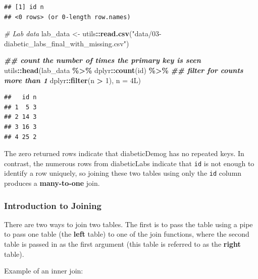 \documentclass[
]{book}
\newenvironment{Shaded}{\begin{snugshade}}{\end{snugshade}}
\newcommand{\AttributeTok}[1]{\textcolor[rgb]{0.13,0.29,0.53}{#1}}
\newcommand{\CommentTok}[1]{\textcolor[rgb]{0.56,0.35,0.01}{\textit{#1}}}
\newcommand{\DataTypeTok}[1]{\textcolor[rgb]{0.13,0.29,0.53}{#1}}
\newcommand{\DecValTok}[1]{\textcolor[rgb]{0.00,0.00,0.81}{#1}}
\newcommand{\DocumentationTok}[1]{\textcolor[rgb]{0.56,0.35,0.01}{\textbf{\textit{#1}}}}
\newcommand{\FunctionTok}[1]{\textcolor[rgb]{0.13,0.29,0.53}{\textbf{#1}}}
\newcommand{\NormalTok}[1]{#1}
\newcommand{\OtherTok}[1]{\textcolor[rgb]{0.56,0.35,0.01}{#1}}
\newcommand{\SpecialCharTok}[1]{\textcolor[rgb]{0.81,0.36,0.00}{\textbf{#1}}}
\newcommand{\StringTok}[1]{\textcolor[rgb]{0.31,0.60,0.02}{#1}}
\begin{document}
\begin{verbatim}
## [1] id n 
## <0 rows> (or 0-length row.names)
\end{verbatim}

\begin{Shaded}
\begin{Highlighting}[]
\CommentTok{\# Lab data}
\NormalTok{lab\_data }\OtherTok{\textless{}{-}}\NormalTok{ utils}\SpecialCharTok{::}\FunctionTok{read.csv}\NormalTok{(}\StringTok{"data/03{-}diabetic\_labs\_final\_with\_missing.csv"}\NormalTok{)}

\DocumentationTok{\#\# count the number of times the primary key is seen}
\NormalTok{utils}\SpecialCharTok{::}\FunctionTok{head}\NormalTok{(lab\_data }\SpecialCharTok{\%\textgreater{}\%}\NormalTok{ dplyr}\SpecialCharTok{::}\FunctionTok{count}\NormalTok{(id) }\SpecialCharTok{\%\textgreater{}\%} 
\DocumentationTok{\#\# filter for counts more than 1}
\NormalTok{    dplyr}\SpecialCharTok{::}\FunctionTok{filter}\NormalTok{(n }\SpecialCharTok{\textgreater{}} \DecValTok{1}\NormalTok{), }\AttributeTok{n =} \DecValTok{4}\DataTypeTok{L}\NormalTok{)}
\end{Highlighting}
\end{Shaded}

\begin{verbatim}
##   id n
## 1  5 3
## 2 14 3
## 3 16 3
## 4 25 2
\end{verbatim}

The zero returned rows indicate that diabeticDemog has no repeated keys. In contrast, the numerous rows from diabeticLabs indicate that \texttt{id} is not enough to identify a row uniquely, so joining these two tables using only the \texttt{id} column produces a \textbf{many-to-one} join.

\subsubsection{Introduction to Joining}\label{sec:IntroToJoining}

There are two ways to join two tables. The first is to pass the table using a pipe to pass one table (the \textbf{left} table) to one of the join functions, where the second table is passed in as the first argument (this table is referred to as the \textbf{right} table).

Example of an inner join:
\end{document}
